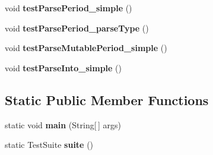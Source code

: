 \begin{DoxyCompactItemize}
\item 
\hypertarget{classorg_1_1joda_1_1time_1_1format_1_1_test_period_formatter_a86e950ea1df1a4ea53cb60e8624271ff}{void {\bfseries test\-Parse\-Period\-\_\-simple} ()}\label{classorg_1_1joda_1_1time_1_1format_1_1_test_period_formatter_a86e950ea1df1a4ea53cb60e8624271ff}

\item 
\hypertarget{classorg_1_1joda_1_1time_1_1format_1_1_test_period_formatter_ae2c2da220f07d56c8a6c7de6d99a5236}{void {\bfseries test\-Parse\-Period\-\_\-parse\-Type} ()}\label{classorg_1_1joda_1_1time_1_1format_1_1_test_period_formatter_ae2c2da220f07d56c8a6c7de6d99a5236}

\item 
\hypertarget{classorg_1_1joda_1_1time_1_1format_1_1_test_period_formatter_ae72efd3f7b47b5938a01be69d3ec0f52}{void {\bfseries test\-Parse\-Mutable\-Period\-\_\-simple} ()}\label{classorg_1_1joda_1_1time_1_1format_1_1_test_period_formatter_ae72efd3f7b47b5938a01be69d3ec0f52}

\item 
\hypertarget{classorg_1_1joda_1_1time_1_1format_1_1_test_period_formatter_a341f3ae55887ff2bdc0ca4f0d85affa1}{void {\bfseries test\-Parse\-Into\-\_\-simple} ()}\label{classorg_1_1joda_1_1time_1_1format_1_1_test_period_formatter_a341f3ae55887ff2bdc0ca4f0d85affa1}

\end{DoxyCompactItemize}
\subsection*{Static Public Member Functions}
\begin{DoxyCompactItemize}
\item 
\hypertarget{classorg_1_1joda_1_1time_1_1format_1_1_test_period_formatter_a8f418ebc15a1cb175c30d150de368864}{static void {\bfseries main} (String\mbox{[}$\,$\mbox{]} args)}\label{classorg_1_1joda_1_1time_1_1format_1_1_test_period_formatter_a8f418ebc15a1cb175c30d150de368864}

\item 
\hypertarget{classorg_1_1joda_1_1time_1_1format_1_1_test_period_formatter_a2f09b1489958f4c0347805682f895459}{static Test\-Suite {\bfseries suite} ()}\label{classorg_1_1joda_1_1time_1_1format_1_1_test_period_formatter_a2f09b1489958f4c0347805682f895459}

\end{DoxyCompactItemize}
